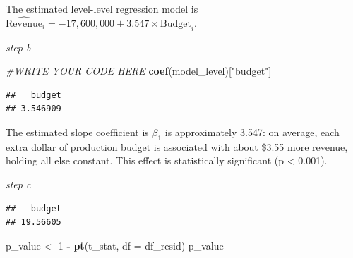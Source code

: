 \documentclass[
]{article}
\newenvironment{Shaded}{\begin{snugshade}}{\end{snugshade}}
\newcommand{\AttributeTok}[1]{\textcolor[rgb]{0.13,0.29,0.53}{#1}}
\newcommand{\CommentTok}[1]{\textcolor[rgb]{0.56,0.35,0.01}{\textit{#1}}}
\newcommand{\DecValTok}[1]{\textcolor[rgb]{0.00,0.00,0.81}{#1}}
\newcommand{\FunctionTok}[1]{\textcolor[rgb]{0.13,0.29,0.53}{\textbf{#1}}}
\newcommand{\NormalTok}[1]{#1}
\newcommand{\OtherTok}[1]{\textcolor[rgb]{0.56,0.35,0.01}{#1}}
\newcommand{\SpecialCharTok}[1]{\textcolor[rgb]{0.81,0.36,0.00}{\textbf{#1}}}
\newcommand{\StringTok}[1]{\textcolor[rgb]{0.31,0.60,0.02}{#1}}
\begin{document}
The estimated level-level regression model is
\(\widehat{\text{Revenue}}_i = -17{,}600{,}000 + 3.547 \times \text{Budget}_i\).

\emph{step b}

\begin{Shaded}
\begin{Highlighting}[]
\CommentTok{\#WRITE YOUR CODE HERE}
\FunctionTok{coef}\NormalTok{(model\_level)[}\StringTok{"budget"}\NormalTok{]}
\end{Highlighting}
\end{Shaded}

\begin{verbatim}
##   budget 
## 3.546909
\end{verbatim}

The estimated slope coefficient is \(\beta_1\) is approximately 3.547:
on average, each extra dollar of production budget is associated with
about \$3.55 more revenue, holding all else constant. This effect is
statistically significant (p \textless{} 0.001).

\emph{step c}

\begin{Shaded}
\end{Shaded}

\begin{verbatim}
##   budget 
## 19.56605
\end{verbatim}

\begin{Shaded}
\begin{Highlighting}[]
\NormalTok{p\_value }\OtherTok{\textless{}{-}} \DecValTok{1} \SpecialCharTok{{-}} \FunctionTok{pt}\NormalTok{(t\_stat, }\AttributeTok{df =}\NormalTok{ df\_resid)}
\NormalTok{p\_value}
\end{Highlighting}
\end{Shaded}
\end{document}
